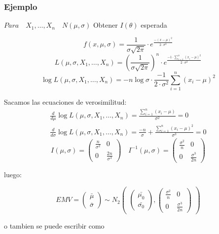 \subsubsection*{Ejemplo}
\(
Para \quad X_1,\dots,X_n \quad N(\mu,\sigma) 
\)
Obtener $I(\theta)$ esperada

\[
f(x,\mu,\sigma)=\frac{1}{\sigma \sqrt{2 \pi}} \cdot e^{\frac{-(x-\mu)^2}{2 \cdot \sigma^2}}
\]\[ L(\mu,\sigma,X_1,\dots,X_n)= \left(\frac{1}{\sigma \sqrt{2 \pi}}\right)^n \cdot e^{\frac{-1 \cdot \sum_{i=1}^{n}(x_i-\mu)^2}{2 \cdot \sigma^2}}
\]\[ \log L(\mu,\sigma,X_1,\dots,X_n)= -n \log \sigma \cdot \frac{-1}{2 \cdot \sigma^2} \sum_{i=1}^{n}(x_i-\mu)^2
\]

Sacamos las ecuaciones de verosimilitud:
\[
\begin{matrix}
    \frac{d}{d \mu} \log L(\mu,\sigma,X_1,\dots,X_n)=\frac{\sum_{i=1}^{n} (x_i-\mu)}{\sigma^2}=0 \\
    \frac{d}{d \sigma} \log L(\mu,\sigma,X_1,\dots,X_n)=\frac{-n}{\sigma}+ \frac{\sum_{i=1}^{n}(x_i-\mu)^2}{\sigma^3}=0
\end{matrix}
\]
\[
I(\mu,\sigma)=
\begin{pmatrix}
    \frac{n}{\sigma^2} & 0\\
    0 & \frac{2n}{\sigma^3}
\end{pmatrix}
\quad I^{-1}(\mu,\sigma)=
\begin{pmatrix}
    \frac{\sigma^2}{n} & 0\\
    0 & \frac{\sigma^3}{2n}
\end{pmatrix}
\]

luego:

\[
EMV=
\begin{pmatrix}
    \bar{\mu}\\
    \bar{\sigma}
\end{pmatrix}
\sim N_2
\begin{pmatrix}

\begin{pmatrix}
    \bar{\mu_0}\\
    \bar{\sigma_0}
\end{pmatrix}
,
\begin{pmatrix}
    \frac{\sigma^2}{n} & 0\\
    0 & \frac{\sigma^3}{2n}
\end{pmatrix}
    
\end{pmatrix}
\]

o tambien se puede escribir como

